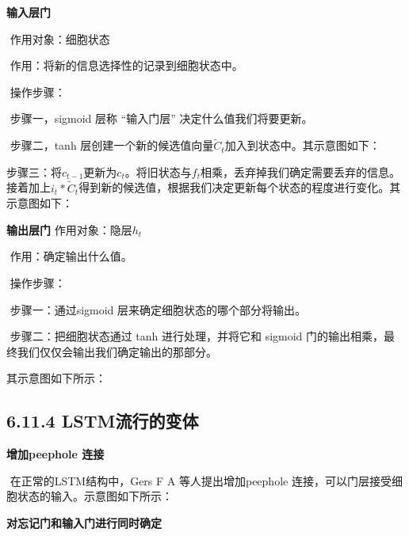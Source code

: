 \textbf{输入层门}

​ 作用对象：细胞状态

​ 作用：将新的信息选择性的记录到细胞状态中。

​ 操作步骤：

​ 步骤一，sigmoid 层称 ``输入门层'' 决定什么值我们将要更新。

​ 步骤二，tanh
层创建一个新的候选值向量\(\tilde{C}_t\)加入到状态中。其示意图如下：


​
步骤三：将\(c_{t-1}\)更新为\(c_{t}\)。将旧状态与\(f_t\)相乘，丢弃掉我们确定需要丢弃的信息。接着加上\(i_t * \tilde{C}_t\)得到新的候选值，根据我们决定更新每个状态的程度进行变化。其示意图如下：


\textbf{输出层门} 作用对象：隐层\(h_t\)

​ 作用：确定输出什么值。

​ 操作步骤：

​ 步骤一：通过sigmoid 层来确定细胞状态的哪个部分将输出。

​ 步骤二：把细胞状态通过 tanh 进行处理，并将它和 sigmoid
门的输出相乘，最终我们仅仅会输出我们确定输出的那部分。

其示意图如下所示：


\subsection{6.11.4
LSTM流行的变体}\label{lstmux6d41ux884cux7684ux53d8ux4f53}

\textbf{增加peephole 连接}

​ 在正常的LSTM结构中，Gers F A 等人提出增加peephole
连接，可以门层接受细胞状态的输入。示意图如下所示：


\textbf{对忘记门和输入门进行同时确定}

